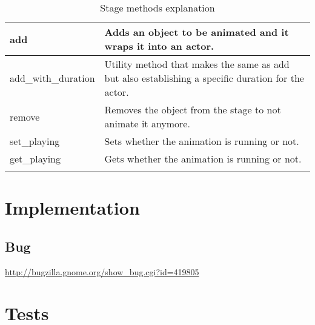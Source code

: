 \begin{table}[H]
  \begin{center}
    \begin{tabularx}{\textwidth}{|X|X|}
      \firsthline
      add & Adds an object to be animated and it wraps it into an actor. \\
      \hline
      add\_with\_duration & Utility method that makes the same as add but also establishing a specific duration for the actor. \\
      \hline
      remove & Removes the object from the stage to not animate it anymore. \\
      \hline
      set\_playing & Sets whether the animation is running or not. \\
      \hline
      get\_playing & Gets whether the animation is running or not. \\
      \lasthline
    \end{tabularx}
    \caption{Stage methods explanation}
  \end{center}
\end{table}

\section{Implementation}

\subsection{Bug}

\url{http://bugzilla.gnome.org/show_bug.cgi?id=419805}

\newpage
\section{Tests}

